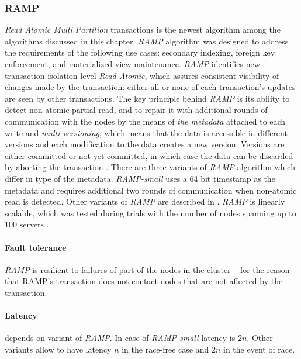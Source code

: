 \subsubsection{RAMP}\label{sec:theory:transactions:ramp}
\emph{Read Atomic Multi Partition} transactions \cite{Bailis:2014} is the newest algorithm among the algorithms discussed in this chapter. 
\emph{RAMP} algorithm was designed to address the requirements of the following use cases: secondary indexing, foreign key
enforcement, and materialized view maintenance.
\emph{RAMP} identifies new transaction isolation level \emph{Read Atomic}, which 
assures consistent visibility of changes made by the transaction: either all or none of each transaction's updates are seen by other transactions.
The key principle behind \emph{RAMP} is its ability to detect non-atomic partial read, and to repair it with additional rounds of communication with the nodes by the means of \emph{the metadata} attached to each write and \emph{multi-versioning}, which means that the data is accessible in different versions and each modification to the data creates a new version. Versions are either committed or not yet committed, in which case the data can be discarded by aborting the transaction \cite[p. 6]{Bailis:2014}. 
There are three variants of \emph{RAMP} algorithm which differ in type of the metadata. \emph{RAMP-small} uses a 64 bit timestamp as the metadata and requires additional two rounds of communication when non-atomic read is detected. Other variants of \emph{RAMP} are described in \cite[p. 5]{Bailis:2014}.
\emph{RAMP} is linearly scalable, which was tested during trials with the number of nodes spanning up to 100 servers \cite[p. 10]{Bailis:2014}.

\paragraph{Fault tolerance} \emph{RAMP} is resilient to failures of part of the nodes in the cluster -- for the reason that RAMP's transaction does not contact nodes that are not affected by the transaction. 

\paragraph{Latency} depends on variant of \emph{RAMP}. In case of \emph{RAMP-small} latency is $2n$. Other variants allow to have latency $n$ in the race-free case and $2n$ in the event of race.

